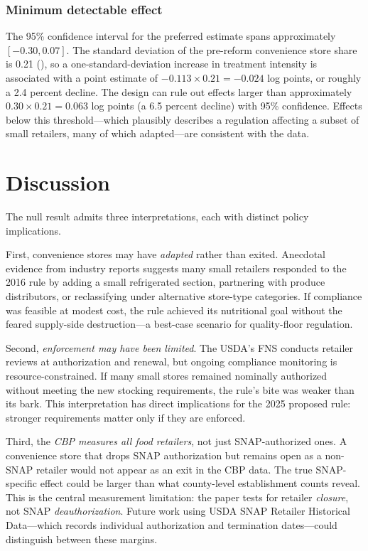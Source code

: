 \documentclass[12pt]{article}
\begin{document}
\subsubsection*{Minimum detectable effect} The 95\% confidence interval for the preferred estimate spans approximately $[-0.30, 0.07]$. The standard deviation of the pre-reform convenience store share is 0.21 (), so a one-standard-deviation increase in treatment intensity is associated with a point estimate of $-0.113 \times 0.21 = -0.024$ log points, or roughly a 2.4 percent decline. The design can rule out effects larger than approximately $0.30 \times 0.21 = 0.063$ log points (a 6.5 percent decline) with 95\% confidence. Effects below this threshold---which plausibly describes a regulation affecting a subset of small retailers, many of which adapted---are consistent with the data.


\section{Discussion}
\label{sec:discussion}

The null result admits three interpretations, each with distinct policy implications.

First, convenience stores may have \textit{adapted} rather than exited. Anecdotal evidence from industry reports suggests many small retailers responded to the 2016 rule by adding a small refrigerated section, partnering with produce distributors, or reclassifying under alternative store-type categories. If compliance was feasible at modest cost, the rule achieved its nutritional goal without the feared supply-side destruction---a best-case scenario for quality-floor regulation.

Second, \textit{enforcement may have been limited}. The USDA's FNS conducts retailer reviews at authorization and renewal, but ongoing compliance monitoring is resource-constrained. If many small stores remained nominally authorized without meeting the new stocking requirements, the rule's bite was weaker than its bark. This interpretation has direct implications for the 2025 proposed rule: stronger requirements matter only if they are enforced.

Third, the \textit{CBP measures all food retailers}, not just SNAP-authorized ones. A convenience store that drops SNAP authorization but remains open as a non-SNAP retailer would not appear as an exit in the CBP data. The true SNAP-specific effect could be larger than what county-level establishment counts reveal. This is the central measurement limitation: the paper tests for retailer \textit{closure}, not SNAP \textit{deauthorization}. Future work using USDA SNAP Retailer Historical Data---which records individual authorization and termination dates---could distinguish between these margins.
\end{document}

